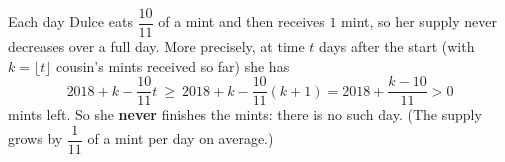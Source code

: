 Each day Dulce eats $\dfrac{10}{11}$ of a mint and then receives $1$ mint, so her supply never decreases over a full day. More precisely, at time $t$ days after the start (with $k=\lfloor t\rfloor$ cousin's mints received so far) she has
\[
2018+k-\dfrac{10}{11}t\ \ge\ 2018+k-\dfrac{10}{11}(k+1)=2018+\dfrac{k-10}{11}>0
\]
mints left. So she \textbf{never} finishes the mints: there is no such day. (The supply grows by $\dfrac{1}{11}$ of a mint per day on average.)
